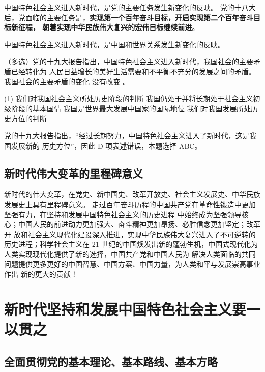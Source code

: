 \documentclass[UTF8,10pt]{ctexbook} %
\begin{document}
中国特色社会主义进入新时代，是党的主要任务发生新变化的反映。
党的十八大后，党面临的主要任务是，\textbf{实现第一个百年奋斗目标，开启实现第二个百年奋斗目标新征程，
朝着实现中华民族伟大复兴的宏伟目标继续前进}。

中国特色社会主义进入新时代，是中国和世界关系发生新变化的反映。

\begin{example}
    （多选）党的十九大报告指出，中国特色社会主义进入新时代，我国社会的主要矛盾已经转化为
    人民日益增长的美好生活需要和不平衡不充分的发展之间的矛盾。我国社会的主要矛盾的变化
    没有改变 \underline{\qquad \qquad \qquad}。
    \begin{tasks}[label={\Alph*.}](1)
        \task 我们对我国社会主义所处历史阶段的判断
        \task 我国仍处于并将长期处于社会主义初级阶段的基本国情
        \task 我国是世界最大发展中国家的国际地位
        \task 我们对我国发展所处历史方位的判断
    \end{tasks}
    \begin{cmt}
        党的十九大报告指出，“经过长期努力，中国特色社会主义进入了新时代，这是我国发展新的
        历史方位”，因此 D 项表述错误，本题选择 ABC。
    \end{cmt}
\end{example}

\subsection{新时代伟大变革的里程碑意义}

新时代的伟大变革，在党史、新中国史、改革开放史、社会主义发展史、中华民族发展史上具有里程碑意义。
走过百年奋斗历程的中国共产党在革命性锻造中更加坚强有力，在坚持和发展中国特色社会主义的历史进程
中始终成为坚强领导核心；中国人民的前进动力更加强大、奋斗精神更加昂扬、必胜信念更加坚定；改革开
放和社会主义现代化建设深入推进，实现中华民族伟大复兴进入了不可逆转的历史进程；科学社会主义在 21
世纪的中国焕发出新的蓬勃生机，中国式现代化为人类实现现代化提供了新的选择，中国共产党和中国人民为
解决人类面临的共同问题提供更多更好的中国智慧、中国方案、中国力量，为人类和平与发展崇高事业作出
新的更大的贡献！

\section{新时代坚持和发展中国特色社会主义要一以贯之}

\subsection{全面贯彻党的基本理论、基本路线、基本方略}
\end{document}
